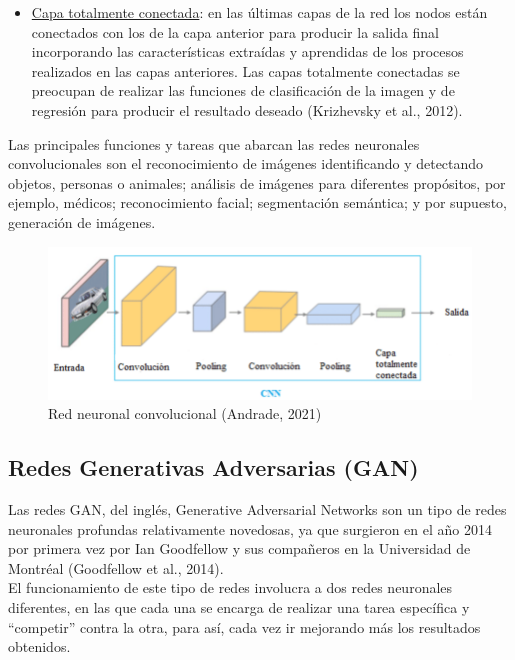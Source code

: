 \begin{itemize}
	\item \underline{Capa totalmente conectada}: en las últimas capas de la red los nodos están conectados con los de la capa anterior para producir la salida final incorporando las características extraídas y aprendidas de los procesos realizados en las capas anteriores. Las capas totalmente conectadas se preocupan de realizar las funciones de clasificación de la imagen y de regresión para producir el resultado deseado (Krizhevsky et al., 2012). \\
	

\end{itemize}

	Las principales funciones y tareas que abarcan las redes neuronales convolucionales son el reconocimiento de imágenes identificando y detectando objetos, personas o animales; análisis de imágenes para diferentes propósitos, por ejemplo, médicos; reconocimiento facial; segmentación semántica; y por supuesto, generación de imágenes.\\
\begin{figure}[h]
	\centering
	\includegraphics[width = 1 \textwidth]{Imagenes/Vectorial/cnn.png}
	\caption{Red neuronal convolucional (Andrade, 2021)}
	\label{fig:cnn}
\end{figure}

\subsection{Redes Generativas Adversarias (GAN)}

Las redes GAN, del inglés, Generative Adversarial Networks son un tipo de redes neuronales profundas relativamente novedosas, ya que surgieron en el año 2014 por primera vez por Ian Goodfellow y sus compañeros en la Universidad de Montréal (Goodfellow et al., 2014). \\

El funcionamiento de este tipo de redes involucra a dos redes neuronales diferentes, en las que cada una se encarga de realizar una tarea específica y “competir” contra la otra, para así, cada vez ir mejorando más los resultados obtenidos. \\

